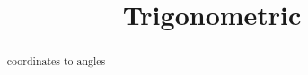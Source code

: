 \documentclass{ximera}
\title{Trigonometric}
\begin{document}
\begin{abstract}
coordinates to angles
\end{abstract}
\maketitle
\end{document}
